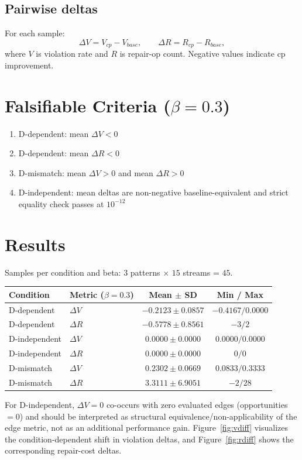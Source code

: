 \documentclass[11pt,a4paper]{article}
\begin{document}
\subsection{Pairwise deltas}
For each sample:
\[
\Delta V = V_{cp} - V_{base},\qquad
\Delta R = R_{cp} - R_{base},
\]
where \(V\) is violation rate and \(R\) is repair-op count.
Negative values indicate cp improvement.

\section{Falsifiable Criteria (\(\beta=0.3\))}
\label{sec:falsifiable_criteria}
\begin{enumerate}
  \item D-dependent: mean \(\Delta V < 0\)
  \item D-dependent: mean \(\Delta R < 0\)
  \item D-mismatch: mean \(\Delta V > 0\) and mean \(\Delta R > 0\)
  \item D-independent: mean deltas are non-negative baseline-equivalent and strict equality check passes at \(10^{-12}\)
\end{enumerate}

\section{Results}
\label{sec:results}
Samples per condition and beta: \(3\) patterns \(\times\) \(15\) streams = \(45\).

\begin{center}
\begin{tabular}{@{}llcc@{}}
\toprule
Condition & Metric (\(\beta=0.3\)) & Mean $\pm$ SD & Min / Max \\
\midrule
D-dependent & $\Delta V$ & $-0.2123 \pm 0.0857$ & $-0.4167 / 0.0000$ \\
D-dependent & $\Delta R$ & $-0.5778 \pm 0.8561$ & $-3 / 2$ \\
D-independent & $\Delta V$ & $0.0000 \pm 0.0000$ & $0.0000 / 0.0000$ \\
D-independent & $\Delta R$ & $0.0000 \pm 0.0000$ & $0 / 0$ \\
D-mismatch & $\Delta V$ & $0.2302 \pm 0.0669$ & $0.0833 / 0.3333$ \\
D-mismatch & $\Delta R$ & $3.3111 \pm 6.9051$ & $-2 / 28$ \\
\bottomrule
\end{tabular}
\end{center}
For D-independent, \(\Delta V=0\) co-occurs with zero evaluated edges (opportunities \(=0\)) and should be interpreted as structural equivalence/non-applicability of the edge metric, not as an additional performance gain.
Figure~\ref{fig:vdiff} visualizes the condition-dependent shift in violation deltas, and Figure~\ref{fig:rdiff} shows the corresponding repair-cost deltas.
\end{document}
